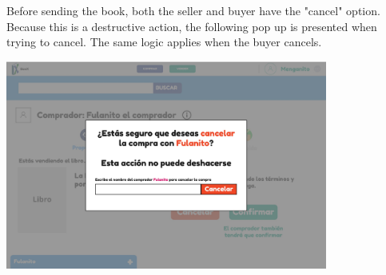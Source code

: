 Before sending the book, both the seller and buyer have the "cancel" option. Because this is a destructive action, the following pop up is presented when trying to cancel. The same logic applies when the buyer cancels.
\begin{center}
    \includegraphics[width=300pt]{img/mockups/Huascar Retrieval Team - Vendedor siendo contactado (2).jpg}
\end{center}